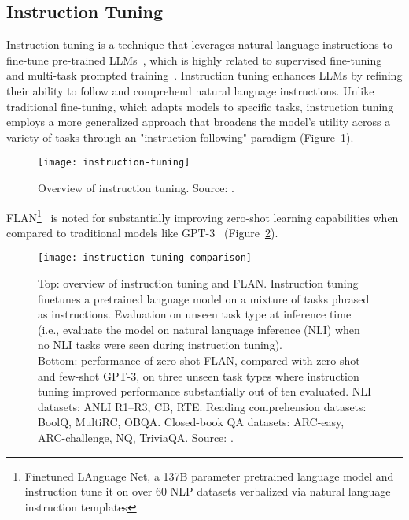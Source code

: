 \subsection{Instruction Tuning}
\label{subsec:instruction-tuning}

Instruction tuning is a technique that leverages natural language instructions to fine-tune pre-trained LLMs~\cite{wei2022fine}, which is highly related to supervised fine-tuning~\cite{ouyang2022training} and multi-task prompted training~\cite{sanhetal2022multitask}.
Instruction tuning enhances LLMs by refining their ability to follow and comprehend natural language instructions.
Unlike traditional fine-tuning, which adapts models to specific tasks, instruction tuning employs a more generalized approach that broadens the model's utility across a variety of tasks through an "instruction-following" paradigm (Figure~\ref{fig:instruction-tuning}).

\begin{figure}[h!]
	\centering
	\texttt{[image: instruction-tuning]}
	\caption{Overview of instruction tuning. Source: \textcite{survey}.}
	\label{fig:instruction-tuning}
\end{figure}

FLAN\footnote{Finetuned LAnguage Net, a 137B parameter pretrained language model and instruction tune it on over 60 NLP datasets verbalized via natural language instruction templates}~\cite{wei2022fine} is noted for substantially improving zero-shot learning capabilities when compared to traditional models like GPT-3~\cite{brown2020language} (Figure~\ref{fig:instruction-tuning-comparison}).

\begin{figure}[h!]
	\centering
	\texttt{[image: instruction-tuning-comparison]}
	\caption{Top: overview of instruction tuning and FLAN. Instruction tuning finetunes a pretrained language model on a mixture of tasks phrased as instructions. Evaluation on unseen task type at inference time (i.e., evaluate the model on natural language inference (NLI) when no NLI tasks were seen during instruction tuning).\\
		Bottom: performance of zero-shot FLAN, compared with zero-shot and few-shot GPT-3, on three unseen task types where instruction tuning improved performance substantially out of ten evaluated. NLI datasets: ANLI R1–R3, CB, RTE. Reading comprehension datasets: BoolQ, MultiRC, OBQA. Closed-book QA datasets: ARC-easy, ARC-challenge, NQ, TriviaQA.
		Source: \textcite{wei2022fine}.}
	\label{fig:instruction-tuning-comparison}
\end{figure}


